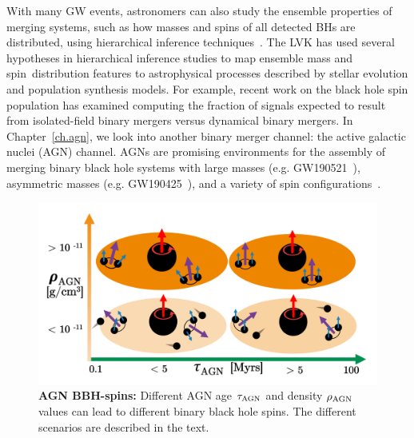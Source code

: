With many GW events, astronomers can also study the ensemble properties of merging systems, such as how masses and spins of all detected BHs are distributed, using hierarchical inference techniques~\cite{gwtc12population, gwtc3population}.
The LVK has used several hypotheses in hierarchical inference studies to map ensemble mass and spin distribution features to astrophysical processes  described by stellar evolution and population synthesis models.
For example, recent work on the black hole spin population has examined computing the fraction of signals expected to result from isolated-field binary mergers versus dynamical binary mergers.
In Chapter~\ref{ch.agn}, we look into another binary merger channel: the active galactic nuclei (AGN) channel.
AGNs are promising environments for the assembly of merging binary black hole systems with large masses (e.g. GW190521~\cite{mckernan2020black}), asymmetric masses (e.g. GW190425~\cite{mckernan2022ligo}), and a variety of spin configurations~\cite{tagawa2020spin, Ford:2021:arXiv, mckernan2020monte}. 

\begin{figure}
\begin{center}
  \centerline{\includegraphics[width=1.\linewidth]{src/figures/agn_spins.png}}
  \caption{\textbf{AGN BBH-spins:} Different AGN age $\tau_{\rm AGN}$ and density $\rho_{\rm AGN}$ values can lead to different binary black hole spins. The different scenarios are described in the text.}
  \label{fig:agn_spins}
\end{center}
\end{figure}


